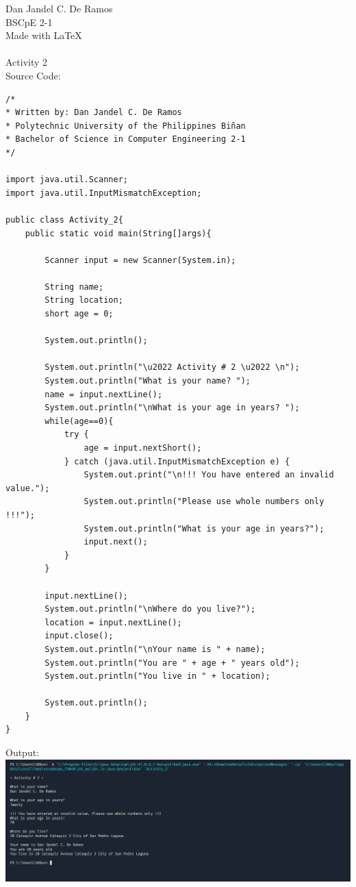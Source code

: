 \documentclass[12pt]{article}
\begin{document}
 
	\noindent
	Dan Jandel C. De Ramos\\
	BSCpE 2-1\\
	Made with \LaTeX \\
	\\
	Activity 2\\
	Source Code:
	
	\begin{verbatim}         
/*
* Written by: Dan Jandel C. De Ramos
* Polytechnic University of the Philippines Biñan
* Bachelor of Science in Computer Engineering 2-1
*/

import java.util.Scanner;
import java.util.InputMismatchException;

public class Activity_2{
	public static void main(String[]args){
		
		Scanner input = new Scanner(System.in);
		
		String name;
		String location;
		short age = 0;
		
		System.out.println();
		
		System.out.println("\u2022 Activity # 2 \u2022 \n");
		System.out.println("What is your name? ");
		name = input.nextLine();
		System.out.println("\nWhat is your age in years? ");        
		while(age==0){            
			try {
				age = input.nextShort();
			} catch (java.util.InputMismatchException e) {            
				System.out.print("\n!!! You have entered an invalid value.");
				System.out.println("Please use whole numbers only !!!");  
				System.out.println("What is your age in years?");
				input.next();          
			}
		}
				
		input.nextLine();
		System.out.println("\nWhere do you live?");
		location = input.nextLine();
		input.close();
		System.out.println("\nYour name is " + name);
		System.out.println("You are " + age + " years old");
		System.out.println("You live in " + location);
		
		System.out.println();
	}
}
	\end{verbatim}
	\clearpage
	\noindent
	Output:\\
	\includegraphics[width=\textwidth]{output}
\end{document}
